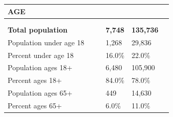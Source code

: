 \documentclass[9pt]{report}
\begin{document}
\vspace{24pt}
\setlength{\tabcolsep}{.01in} %
\begin{tabular}{p{.10in}p{.10in}p{.10in}p{3.7in}>{\hfill}p{.85in}>{\hfill}p{.85in}>{\hfill}p{.85in}>{\hfill}p{.85in}p{0.1in}}
\multicolumn{9}{l}{\parbox{7.1in}{\raggedright{\large{\strut\textbf{AGE}\strut}}}} \\ 
\hline
\multicolumn{4}{l}{\parbox{3.5in}{\raggedright{\textbf{}}}} & \multicolumn{1}{r}{\parbox{.85in}{\strut\raggedleft{\textbf{}\strut}}} & \multicolumn{1}{r}{\parbox{.85in}{\strut\raggedleft{\textbf{}\strut}}} & \multicolumn{1}{r}{\parbox{.85in}{\strut{}}} & \multicolumn{1}{r}{\parbox{.85in}{\strut{}}} & \\ 
\multicolumn{9}{l}{} \\ 
\multicolumn{4}{l}{\parbox{3.5in}{\strut\raggedright{\textbf{Total population}\strut}}} & \textbf{} & \textbf{} & \textbf{7,748} & \textbf{135,736} & \textbf{} \\ 
\multicolumn{4}{l}{\parbox{3.6in}{\strut\raggedright{{Population under age 18}}\strut}} &  &  & 1,268 & 29,836 & \multicolumn{1}{l}{}  \\ 
\multicolumn{4}{l}{\parbox{3.6in}{\strut\raggedright{{Percent under age 18}}\strut}} &  &  & 16.0\% & 22.0\% & \multicolumn{1}{l}{}  \\ 
\multicolumn{4}{l}{\parbox{3.6in}{\strut\raggedright{{Population ages 18+}}\strut}} &  &  & 6,480 & 105,900 & \multicolumn{1}{l}{}  \\ 
\multicolumn{4}{l}{\parbox{3.6in}{\strut\raggedright{{Percent ages 18+}}\strut}} &  &  & 84.0\% & 78.0\% & \multicolumn{1}{l}{}  \\ 
\multicolumn{4}{l}{\parbox{3.6in}{\strut\raggedright{{Population ages 65+}}\strut}} &  &  & 449 & 14,630 & \multicolumn{1}{l}{}  \\ 
\multicolumn{4}{l}{\parbox{3.6in}{\strut\raggedright{{Percent ages 65+}}\strut}} &  &  & 6.0\% & 11.0\% & \multicolumn{1}{l}{}  \\ 

\end{tabular}
\setlength{\tabcolsep}{6pt} %
\end{document}
